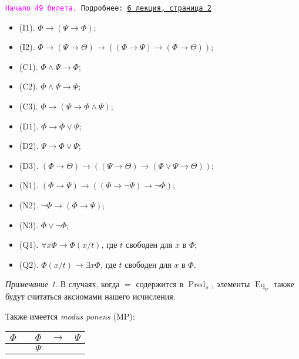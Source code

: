 \documentclass[a4paper,100pt]{article}
\theoremstyle{indented}
\theoremstyle{definition}
\theoremstyle{remark}
\newtheorem{remark}{Примечание}
\DeclareMathOperator{\Pred}{Pred}
\DeclareMathOperator{\Eq}{Eq}
\begin{document}
\hrulefill

\texttt{\hypertarget{b49}{\textcolor{magenta}{Начало 49 билета.}} Подробнее: \href{http://www.mi-ras.ru/~speranski/courses/logic-1-2021-spring/slides_6.pdf}{6 лекция, страница 2}} 

\begin{itemize}
  \item (I1). $\Phi\rightarrow (\Psi\rightarrow \Phi)$;
  \item (I2). $\Phi\rightarrow (\Psi\rightarrow \Theta)\rightarrow((\Phi\rightarrow \Psi)\rightarrow (\Phi\rightarrow \Theta))$; 
  \item (C1). $\Phi \wedge \Psi \rightarrow \Phi$; 
  \item (C2). $\Phi \wedge \Psi \rightarrow \Psi$; 
  \item (C3). $\Phi\rightarrow (\Psi \rightarrow \Phi \wedge \Psi)$;
  \item (D1). $\Phi\rightarrow \Phi \vee\Psi$;
  \item (D2). $\Psi\rightarrow \Phi \vee \Psi$; 
  \item (D3). $(\Phi\rightarrow \Theta)\rightarrow((\Psi\rightarrow \Theta)\rightarrow (\Phi\vee\Psi\rightarrow\Theta))$;
  \item (N1). $(\Phi\rightarrow \Psi)\rightarrow((\Phi\rightarrow \neg \Psi)\rightarrow \neg \Phi)$; 
  \item (N2). $\neg\Phi \rightarrow (\Phi\rightarrow \Psi)$; 
  \item (N3). $\Phi \vee \neg \Phi$;
  \item (Q1). $\forall x \Phi \rightarrow \Phi(x/t)$, где $t$ свободен для $x$ в $\Phi$;
  \item (Q2). $\Phi(x/t)\rightarrow \exists x \Phi$, где $t$ свободен для $x$ в $\Phi$. 
\end{itemize}

\begin{remark}
  В случаях, когда $=$ содержится в $\Pred_\sigma$, элементы $\Eq_\sigma$ также будут считаться аксиомами нашего исчисления.
\end{remark}

Также имеется \textit{modus ponens} (MP):

\begin{center}
  \begin{tabular}{c c c c c}
    $\Phi$ & & $\Phi$ & $\rightarrow$ & $\Psi$ \\ 
    \hline
    & & $\Psi$ & & 
  \end{tabular}
\end{center}
\end{document}
